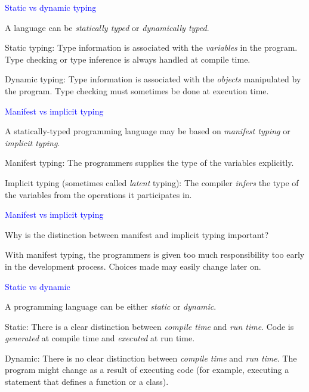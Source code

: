 \documentclass{slides}
\newcommand{\ti}[1]{\begin{center}\Large{\textcolor{blue}{#1}}\end{center}}
\begin{document}
\begin{slide}\ti{Static vs dynamic typing}

A language can be \emph{statically typed} or \emph{dynamically
  typed}.

Static typing: Type information is associated with the
\emph{variables} in the program.  Type checking or type inference is
always handled at compile time.

Dynamic typing: Type information is associated with the \emph{objects}
manipulated by the program.  Type checking must sometimes be done at
execution time.

\vfill\end{slide}
\begin{slide}\ti{Manifest vs implicit typing}

A statically-typed programming language may be based on \emph{manifest
  typing} or \emph{implicit typing}.

Manifest typing: The programmers supplies the type of the variables
explicitly.

Implicit typing (sometimes called \emph{latent} typing): The compiler
\emph{infers} the type of the variables from the operations it
participates in.

\vfill\end{slide}
\begin{slide}\ti{Manifest vs implicit typing}

Why is the distinction between manifest and implicit typing important?

With manifest typing, the programmers is given too much responsibility
too early in the development process.  Choices made may easily change
later on.

\vfill\end{slide}
\begin{slide}\ti{Static vs dynamic}

A programming language can be either \emph{static} or \emph{dynamic}.

Static: There is a clear distinction between \emph{compile time} and
\emph{run time}.  Code is \emph{generated} at compile time and
\emph{executed} at run time.

Dynamic: There is no clear distinction between \emph{compile time} and
\emph{run time}.  The program might change as a result of executing
code (for example, executing a statement that defines a function or a
class).

\vfill\end{slide}
\end{document}
